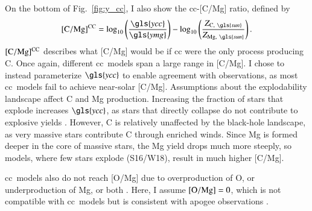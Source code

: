 \documentclass[12pt,oneside,letterpaper]{report}
\newcommand{\cc}{\gls{cc}}
\newcommand{\Cc}{\Gls{cc}}
\newcommand{\apogee}{\gls{apogee}}
\newcommand{\Ycc}{\gls{ycc}}
\newcommand{\Yoc}{\gls{ymg}}
\newcommand{\sun}{\gls{sun}}
\begin{document}
On the bottom of Fig.~\ref{fig:y_cc}, I also show the \cc{}-[C/Mg] ratio, defined by
\begin{equation}\label{eq:c_mg_cc}
    {\rm [C/Mg]^{CC}} = \log_{10}\left( \frac{\Ycc}{\Yoc}\right) - \log_{10} \left( \frac{Z_{{\rm C},\ \sun }}{Z_{{\rm Mg},\ \sun }} \right).
\end{equation}
${\rm [C/Mg]^{CC}}$ describes what [C/Mg] would be if \cc{} were the only process producing C.
Once again, different \cc\ models span a large range in [C/Mg]. 
I chose to instead parameterize $\Ycc$ to enable agreement with observations, as most \cc\ models fail to achieve near-solar [C/Mg].
Assumptions about the explodability landscape affect C and Mg production. Increasing the fraction of stars that explode increases $\Ycc$, as stars that directly collapse do not contribute to explosive yields \citep{emily+21}. However, C is relatively unaffected by the black-hole landscape, as very massive stars contribute C through enriched winds. Since Mg is formed deeper in the core of massive stars, the Mg yield drops much more steeply, so models, where few stars explode (S16/W18), result in much higher [C/Mg].

\Cc\ models also do not reach [O/Mg] due to overproduction of O, or underproduction of Mg, or both \citep{emily+21}. Here, I assume ${\rm [O/Mg]} = 0$, which is not compatible with \cc\ models but is consistent with \apogee{} observations \citep{weinberg+19, weinberg+22}.
    
\end{document}
